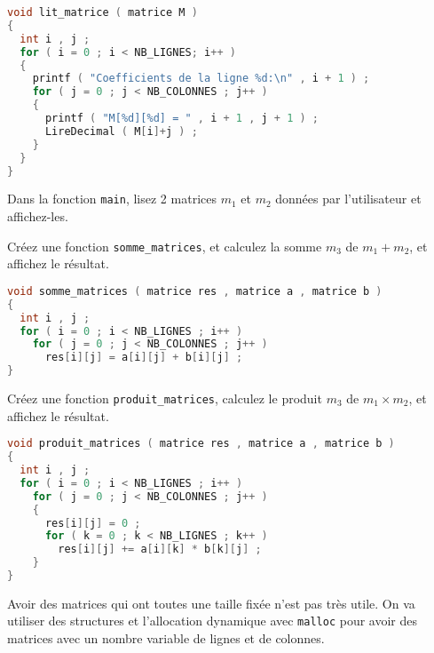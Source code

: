 \begin{solutioncachee}
  \begin{lstlisting}[language=C]
void lit_matrice ( matrice M )
{
  int i , j ;
  for ( i = 0 ; i < NB_LIGNES; i++ )
  {
    printf ( "Coefficients de la ligne %d:\n" , i + 1 ) ;
    for ( j = 0 ; j < NB_COLONNES ; j++ )
    {
      printf ( "M[%d][%d] = " , i + 1 , j + 1 ) ;
      LireDecimal ( M[i]+j ) ;
    }
  }
}
  \end{lstlisting}
\end{solutioncachee}

\question Dans la fonction \texttt{main}, lisez 2 matrices \(m_1\) et
\(m_2\) données par l'utilisateur et affichez-les.

\question Créez une fonction \texttt{somme\_matrices}, et calculez la
somme \(m_3\) de \(m_1+m_2\), et affichez le résultat.

\begin{solutioncachee}
  \begin{lstlisting}[language=C]
void somme_matrices ( matrice res , matrice a , matrice b )
{
  int i , j ;
  for ( i = 0 ; i < NB_LIGNES ; i++ )
    for ( j = 0 ; j < NB_COLONNES ; j++ )
      res[i][j] = a[i][j] + b[i][j] ;
}
  \end{lstlisting}
\end{solutioncachee}


\question Créez une fonction \texttt{produit\_matrices}, calculez le produit \(m_3\) de \(m_1\times m_2\), et
affichez le résultat.

\begin{solutioncachee}
  \begin{lstlisting}[language=C]
void produit_matrices ( matrice res , matrice a , matrice b )
{
  int i , j ;
  for ( i = 0 ; i < NB_LIGNES ; i++ )
    for ( j = 0 ; j < NB_COLONNES ; j++ )
    {
      res[i][j] = 0 ;
      for ( k = 0 ; k < NB_LIGNES ; k++ )
        res[i][j] += a[i][k] * b[k][j] ;
    }
}
  \end{lstlisting}
\end{solutioncachee}



\usetikzlibrary{positioning,matrix, arrows.meta}

Avoir des matrices qui ont toutes une taille fixée n'est pas très
utile. On va utiliser des structures et l'allocation dynamique avec
\texttt{malloc} pour avoir des matrices avec un nombre variable de
lignes et de colonnes.

